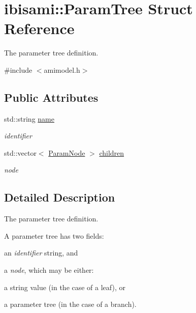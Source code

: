 \hypertarget{structibisami_1_1_param_tree}{}\section{ibisami\+:\+:Param\+Tree Struct Reference}
\label{structibisami_1_1_param_tree}


The parameter tree definition.  




{\ttfamily \#include $<$amimodel.\+h$>$}

\subsection*{Public Attributes}
\begin{DoxyCompactItemize}
\item 
std\+::string \hyperlink{structibisami_1_1_param_tree_a6776eb67c955420e87360ed764bc5cf3}{name}
\begin{DoxyCompactList}\small\item\em identifier \end{DoxyCompactList}\item 
std\+::vector$<$ \hyperlink{namespaceibisami_a56481565abb44593a678738f57c04109}{Param\+Node} $>$ \hyperlink{structibisami_1_1_param_tree_a512771aaec7a303ebcafd7c66812dd7f}{children}
\begin{DoxyCompactList}\small\item\em node \end{DoxyCompactList}\end{DoxyCompactItemize}


\subsection{Detailed Description}
The parameter tree definition. 

A parameter tree has two fields\+:
\begin{DoxyItemize}
\item an {\itshape identifier} string, and
\item a {\itshape node}, which may be either\+:
\begin{DoxyItemize}
\item a string value (in the case of a leaf), or
\item a parameter tree (in the case of a branch). 
\end{DoxyItemize}
\end{DoxyItemize}

